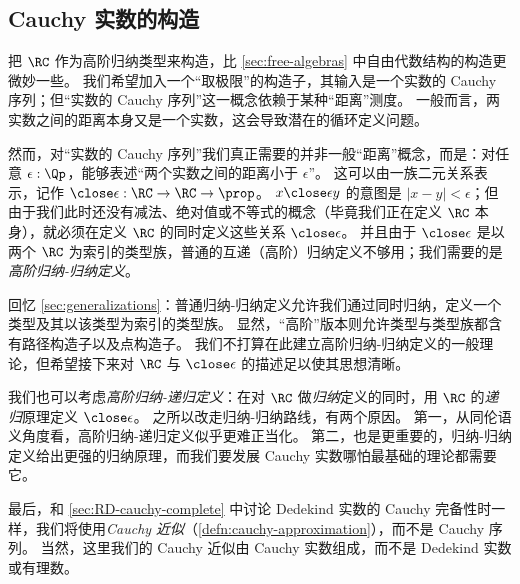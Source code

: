 \subsection{Cauchy 实数的构造}
\label{sec:constr-cauchy-reals}

把 $\RC$ 作为高阶归纳类型来构造，比 \cref{sec:free-algebras} 中自由代数结构的构造更微妙一些。
我们希望加入一个“取极限”的构造子，其输入是一个实数的 Cauchy 序列；但“实数的 Cauchy 序列”这一概念依赖于某种“距离”测度。
一般而言，两实数之间的距离本身又是一个实数，这会导致潜在的循环定义问题。

然而，对“实数的 Cauchy 序列”我们真正需要的并非一般“距离”概念，而是：对任意 $\epsilon:\Qp$，能够表述“两个实数之间的距离小于 $\epsilon$”。
这可以由一族二元关系表示，记作 $\mathord{\close\epsilon} : \RC\to\RC\to \prop$。
$x \close\epsilon y$ 的意图是 $|x - y| < \epsilon$；但由于我们此时还没有减法、绝对值或不等式的概念（毕竟我们正在定义 $\RC$ 本身），就必须在定义 $\RC$ 的同时定义这些关系 $\close\epsilon$。
并且由于 $\close\epsilon$ 是以两个 $\RC$ 为索引的类型族，普通的互递（高阶）归纳定义不够用；我们需要的是\emph{高阶归纳-归纳定义}。

回忆 \cref{sec:generalizations}：普通归纳-归纳定义允许我们通过同时归纳，定义一个类型及其以该类型为索引的类型族。
显然，“高阶”版本则允许类型与类型族都含有路径构造子以及点构造子。
我们不打算在此建立高阶归纳-归纳定义的一般理论，但希望接下来对 $\RC$ 与 $\close\epsilon$ 的描述足以使其思想清晰。

\begin{rmk}
  我们也可以考虑\emph{高阶归纳-递归定义}：在对 $\RC$ 做\emph{归纳}定义的同时，用 $\RC$ 的\emph{递归}原理定义 $\close\epsilon$。
  之所以改走归纳-归纳路线，有两个原因。
  第一，从同伦语义角度看，高阶归纳-递归定义似乎更难正当化。
  第二，也是更重要的，归纳-归纳定义给出更强的归纳原理，而我们要发展 Cauchy 实数哪怕最基础的理论都需要它。
\end{rmk}

最后，和 \cref{sec:RD-cauchy-complete} 中讨论 Dedekind 实数的 Cauchy 完备性时一样，我们将使用\emph{Cauchy 近似}（\cref{defn:cauchy-approximation}），而不是 Cauchy 序列。
当然，这里我们的 Cauchy 近似由 Cauchy 实数组成，而不是 Dedekind 实数或有理数。

